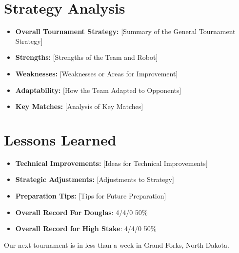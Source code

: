 \section*{Strategy Analysis}
\begin{itemize}
    \item \textbf{Overall Tournament Strategy:} [Summary of the General Tournament Strategy]
    \item \textbf{Strengths:} [Strengths of the Team and Robot]
    \item \textbf{Weaknesses:} [Weaknesses or Areas for Improvement]
    \item \textbf{Adaptability:} [How the Team Adapted to Opponents]
    \item \textbf{Key Matches:} [Analysis of Key Matches]
\end{itemize}

\section*{Lessons Learned}
\begin{itemize}
    \item \textbf{Technical Improvements:} [Ideas for Technical Improvements]
    \item \textbf{Strategic Adjustments:} [Adjustments to Strategy]
    \item \textbf{Preparation Tips:} [Tips for Future Preparation]
    \item \textbf{Overall Record For Douglas}: 4/4/0 50\%
    \item \textbf{Overall Record for High Stake}: 4/4/0 50\%
\end{itemize}
Our next tournament is in less than a week in Grand Forks, North Dakota.

